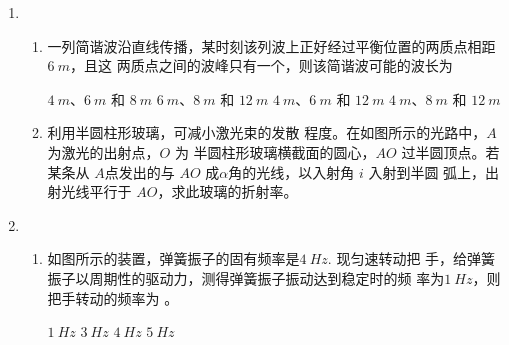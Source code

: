 \begin{enumerate}
\begin{enumerate}
\end{enumerate}


\item 
{}
\begin{enumerate}
	\item
一列简谐波沿直线传播，某时刻该列波上正好经过平衡位置的两质点相距 $ 6 \ m $，且这
两质点之间的波峰只有一个，则该简谐波可能的波长为  

\fourchoices
{$ 4 \ m $、$ 6 \ m $ 和 $ 8 \ m $}
{$ 6 \ m $、$ 8 \ m $ 和 $ 12 \ m $}
{$ 4 \ m $、$ 6 \ m $ 和 $ 12 \ m $}
{$ 4 \ m $、$ 8 \ m $ 和 $ 12 \ m $}



\item 
利用半圆柱形玻璃，可减小激光束的发散
程度。在如图所示的光路中，$ A $ 为激光的出射点，$ O $ 为
半圆柱形玻璃横截面的圆心，$ AO $ 过半圆顶点。若某条从
$ A $点发出的与 $ AO $ 成$ \alpha $角的光线，以入射角 $ i $ 入射到半圆
弧上，出射光线平行于 $ AO $，求此玻璃的折射率。
\begin{figure}[h!]
	\flushright
	
\end{figure}

\end{enumerate}


\item 
{}
\begin{enumerate}
	\item
如图所示的装置，弹簧振子的固有频率是$ 4 \ Hz $. 现匀速转动把
手，给弹簧振子以周期性的驱动力，测得弹簧振子振动达到稳定时的频
率为$ 1 \ Hz $，则把手转动的频率为 \underlinegap 。
\begin{figure}[h!]
	\centering
	
\end{figure}

\fourchoices
{$1 \ Hz $}
{$3 \ Hz $}
{$4 \ Hz $}
{$5 \ Hz $}


\end{enumerate}
\end{enumerate}

